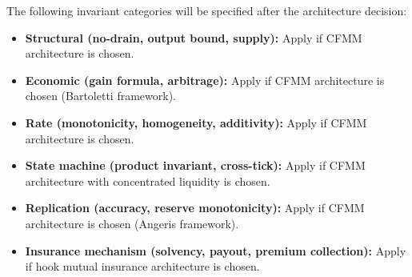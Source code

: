 The following invariant categories will be specified after the architecture decision:

\begin{itemize}
  \item \textbf{Structural (no-drain, output bound, supply):}
    Apply if CFMM architecture is chosen.
  \item \textbf{Economic (gain formula, arbitrage):}
    Apply if CFMM architecture is chosen (Bartoletti framework).
  \item \textbf{Rate (monotonicity, homogeneity, additivity):}
    Apply if CFMM architecture is chosen.
  \item \textbf{State machine (product invariant, cross-tick):}
    Apply if CFMM architecture with concentrated liquidity is chosen.
  \item \textbf{Replication (accuracy, reserve monotonicity):}
    Apply if CFMM architecture is chosen (Angeris framework).
  \item \textbf{Insurance mechanism (solvency, payout, premium collection):}
    Apply if hook mutual insurance architecture is chosen.
\end{itemize}
